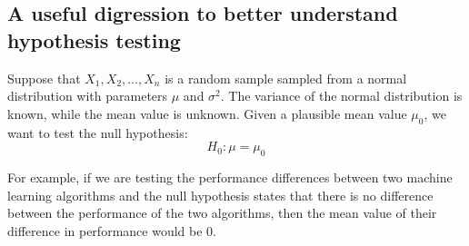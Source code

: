 \subsection{A useful digression to better understand hypothesis testing}
Suppose that $X_{1}, X_{2}, \hdots, X_{n}$ is a random sample sampled from a normal
distribution with parameters $\mu$ and $\sigma^{2}$. The variance of the normal
distribution is known, while the mean value is unknown. Given a plausible mean
value $\mu_{0}$, we want to test the null hypothesis:
\[
	H_{0}: \mu = \mu_{0}
\]

For example, if we are testing the performance differences between two machine
learning algorithms and the null hypothesis states that there is no difference
between the performance of the two algorithms, then the mean value of their difference
in performance would be 0.
\newline

